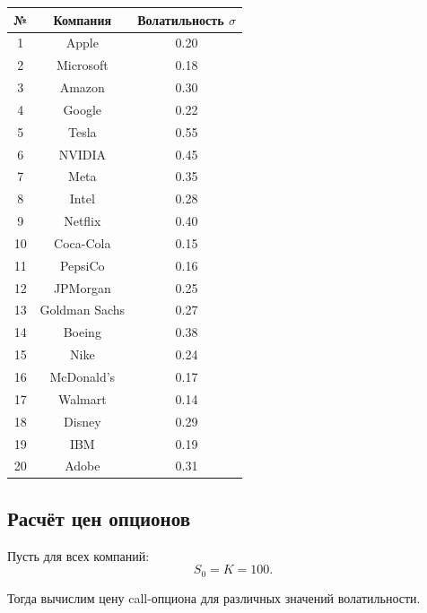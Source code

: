 \begin{center}
\begin{tabular}{|c|c|c|}
\hline
№ & Компания & Волатильность \(\sigma\) \\
\hline
1 & Apple & 0.20 \\
2 & Microsoft & 0.18 \\
3 & Amazon & 0.30 \\
4 & Google & 0.22 \\
5 & Tesla & 0.55 \\
6 & NVIDIA & 0.45 \\
7 & Meta & 0.35 \\
8 & Intel & 0.28 \\
9 & Netflix & 0.40 \\
10 & Coca-Cola & 0.15 \\
11 & PepsiCo & 0.16 \\
12 & JPMorgan & 0.25 \\
13 & Goldman Sachs & 0.27 \\
14 & Boeing & 0.38 \\
15 & Nike & 0.24 \\
16 & McDonald's & 0.17 \\
17 & Walmart & 0.14 \\
18 & Disney & 0.29 \\
19 & IBM & 0.19 \\
20 & Adobe & 0.31 \\
\hline
\end{tabular}
\end{center}

\subsection*{Расчёт цен опционов}

Пусть для всех компаний:
\[
S_0 = K = 100.
\]

Тогда вычислим цену call-опциона для различных значений волатильности.

